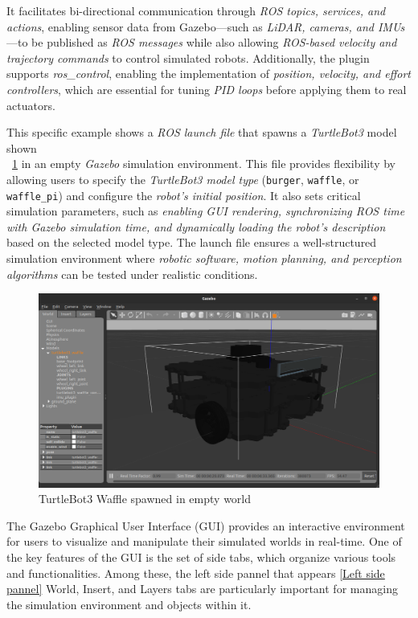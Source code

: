 \documentclass[../../main]{subfiles}
\begin{document}
It facilitates bi-directional communication through \emph{ROS topics, services, and actions}, 
enabling sensor data from Gazebo—such as \emph{LiDAR, cameras, and IMUs}—to be published as \emph{ROS messages} 
while also allowing \emph{ROS-based velocity and trajectory commands} to control simulated robots. 
Additionally, the plugin supports \emph{ros\_control}, enabling the implementation of \emph{position, velocity, and effort controllers}, 
which are essential for tuning \emph{PID loops} before applying them to real actuators.  

This specific example shows a \emph{ROS launch file} that spawns a \emph{TurtleBot3} model shown\\ ~\cref{TurtleBot3 in empty world} in an empty \emph{Gazebo} simulation environment. 
This file provides flexibility by allowing users to specify the \emph{TurtleBot3 model type} (\texttt{burger}, \texttt{waffle}, or \texttt{waffle\_pi}) 
and configure the \emph{robot's initial position}. It also sets critical simulation parameters, 
such as \emph{enabling GUI rendering, synchronizing ROS time with Gazebo simulation time, 
and dynamically loading the robot’s description} based on the selected model type. 
The launch file ensures a well-structured simulation environment where \emph{robotic software, motion planning, and perception algorithms} 
can be tested under realistic conditions. 

\begin{figure}[H]
    \centering
\includegraphics[width=\textwidth]{fig/turtlebot3_waffle.png}
\caption{TurtleBot3 Waffle spawned in empty world}
\label{TurtleBot3 in empty world} %
\end{figure}

The Gazebo Graphical User Interface (GUI) provides an interactive environment for users to visualize and manipulate their simulated worlds in real-time. 
One of the key features of the GUI is the set of side tabs, which organize various tools and functionalities. Among these, the left side pannel that appears \cref{Left side pannel} World, Insert, 
and Layers tabs are particularly important for managing the simulation environment and objects within it.
\end{document}
